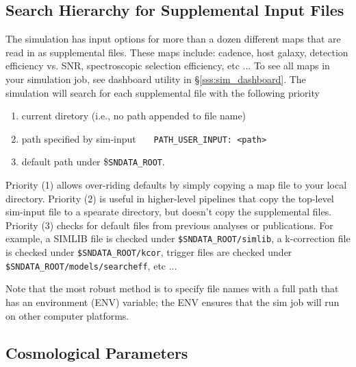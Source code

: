\documentclass[12pt]{article}
\newcommand{\sndataroot}{{\tt SNDATA\_ROOT}}
\begin{document}
{%
   \subsection{Search Hierarchy for Supplemental Input Files}
   \label{subsec:sim_inpfiles}

The simulation has input options for more than a dozen different 
maps that are read in as supplemental files. These maps include:
cadence, host galaxy, detection efficiency vs. SNR, 
spectroscopic selection efficiency, etc ...
To see all maps in your simulation job, 
see dashboard utility in \S\ref{sss:sim_dashboard}.
The simulation will search for each supplemental file with
the following priority
\begin{enumerate}[noitemsep]
  \item current diretory (i.e., no path appended to file name)
  \item path specified by sim-input~~~ {\tt PATH\_USER\_INPUT: <path>}
  \item default path under \$\sndataroot.
\end{enumerate}
%
Priority (1) allows over-riding defaults by
simply copying a map file to your local directory.
Priority (2) is useful in higher-level pipelines that
copy the top-level sim-input file to a spearate directory, 
but doesn't copy the supplemental files.
Priority (3) checks for default files from
previous analyses or publications. For example,
a SIMLIB file is checked under 
{\tt \$SNDATA\_ROOT/simlib},
a k-correction file is checked under
{\tt \$SNDATA\_ROOT/kcor},
trigger files are checked under
{\tt \$SNDATA\_ROOT/models/searcheff}, etc ...

Note that the most robust method is to specify file names with a 
full path that has an environment (ENV) variable; the ENV ensures that
the sim job will run on other computer platforms.

   \subsection{Cosmological Parameters}
   \label{subsec:sim_cosmopar}

}
\end{document}
